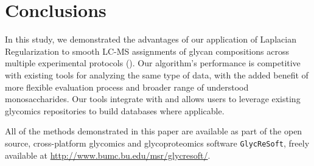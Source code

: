 \section{Conclusions}
    In this study, we demonstrated the advantages of our application of Laplacian
    Regularization to smooth LC-MS assignments of glycan compositions across multiple
    experimental protocols (\citealp{Hu2012, Khatri2016a}). Our algorithm's performance is
    competitive with existing tools for analyzing the same type of data, with the added
    benefit of more flexible evaluation process and broader range of understood monosaccharides.
    Our tools integrate with \glyspace and allows users to leverage existing glycomics
    repositories to build databases where applicable.

    All of the methods demonstrated in this paper are available as part of the open source,
    cross-platform glycomics and glycoproteomics software \texttt{GlycReSoft}, freely
    available at \href{http://www.bumc.bu.edu/msr/glycresoft/}{http://www.bumc.bu.edu/msr/glycresoft/}.
